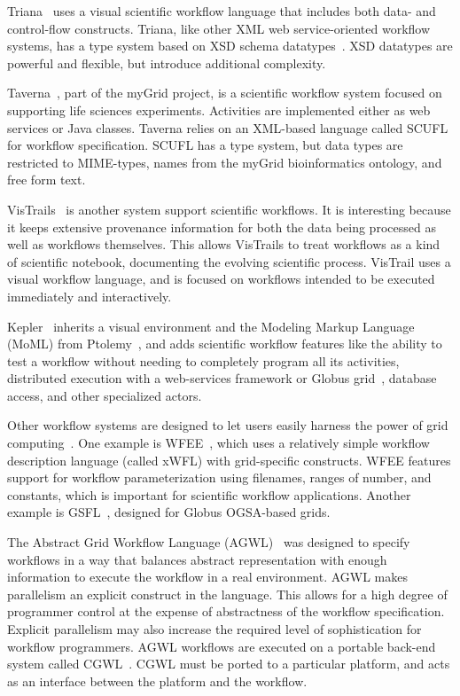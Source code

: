 Triana~\cite{churches06triana}\cite{majithia04triana} uses a
visual scientific workflow language that includes both data- and
control-flow constructs. Triana, like other XML web
service-oriented workflow systems, has a type system based on XSD
schema datatypes~\cite{biron04xsd}. XSD datatypes are powerful and
flexible, but introduce additional complexity.

Taverna~\cite{oinn04taverna}, part of the myGrid project, is a
scientific workflow system focused on supporting life sciences
experiments. Activities are implemented either as web services or
Java classes. Taverna relies on an XML-based language called SCUFL
for workflow specification. SCUFL has a type system, but data
types are restricted to MIME-types, names from the myGrid
bioinformatics ontology, and free form text.

VisTrails~\cite{callahan06vistrails} is another system support
scientific workflows. It is interesting because it keeps extensive
provenance information for both the data being processed as well
as workflows themselves. This allows VisTrails to treat workflows
as a kind of scientific notebook, documenting the evolving
scientific process. VisTrail uses a visual workflow language, and
is focused on workflows intended to be executed immediately and
interactively.

Kepler~\cite{altintas04kepler} inherits a visual environment and
the Modeling Markup Language (MoML) from
Ptolemy~\cite{hylands03ptolemy}, and adds scientific workflow
features like the ability to test a workflow without needing to
completely program all its activities, distributed execution with
a web-services framework or Globus grid~\cite{globus}, database
access, and other specialized actors.

Other workflow systems are designed to let users easily harness
the power of grid computing~\cite{foster02grid}. One example is
WFEE~\cite{yu04tuple}, which uses a relatively simple workflow
description language (called xWFL) with grid-specific constructs.
WFEE features support for workflow parameterization using
filenames, ranges of number, and constants, which is important for
scientific workflow applications. Another example is
GSFL~\cite{krishnan02gsfl}, designed for Globus OGSA-based grids.

The Abstract Grid Workflow Language (AGWL)~\cite{fahringer04agwl}
was designed to specify workflows in a way that balances abstract
representation with enough information to execute the workflow in
a real environment. AGWL makes parallelism an explicit construct
in the language. This allows for a high degree of programmer
control at the expense of abstractness of the workflow
specification. Explicit parallelism may also increase the required
level of sophistication for workflow programmers. AGWL workflows
are executed on a portable back-end system called
CGWL~\cite{fahringer05agwl}. CGWL must be ported to a particular
platform, and acts as an interface between the platform and the
workflow.

